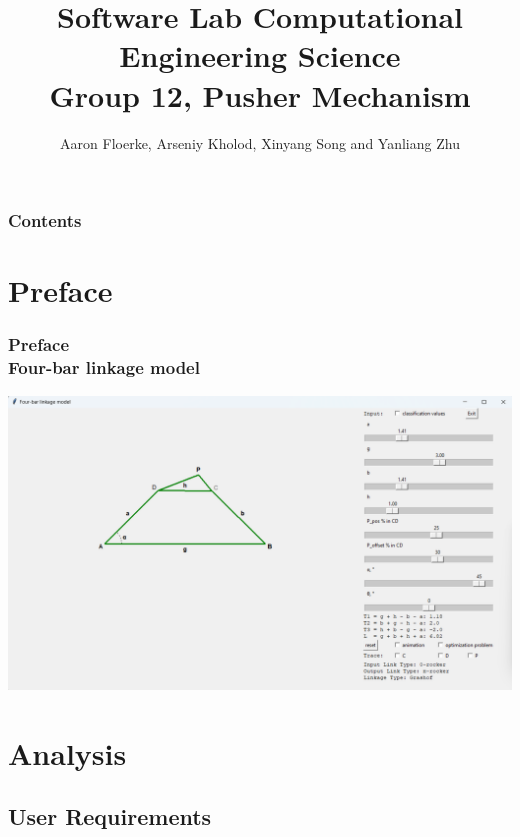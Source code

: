 \documentclass[ucs,10pt]{beamer}
\begin{document}
\title[{\tt info@stce.rwth-aachen.de}]{\textcolor{rwth-blue}{Software Lab Computational Engineering Science} \vspace{.2cm} \\ {\small Group 12, Pusher Mechanism}}
\author[Group 12, Pusher Mechanism]{Aaron Floerke, Arseniy Kholod, Xinyang Song and Yanliang Zhu} 
\date[]{}

\begin{frame}[plain]
\titlepage
\end{frame}

\begin{frame}
	\frametitle{Contents}
\tableofcontents
\end{frame}

\section{Preface}

\begin{frame}
\frametitle{Preface \\
	\small \color{rwth-blue} Four-bar linkage model}
	\begin{center}
		\includegraphics[width=\linewidth]{./GUI_screen.png}
	\end{center}
\end{frame}

\section{Analysis}

\subsection{User Requirements}
\end{document}
